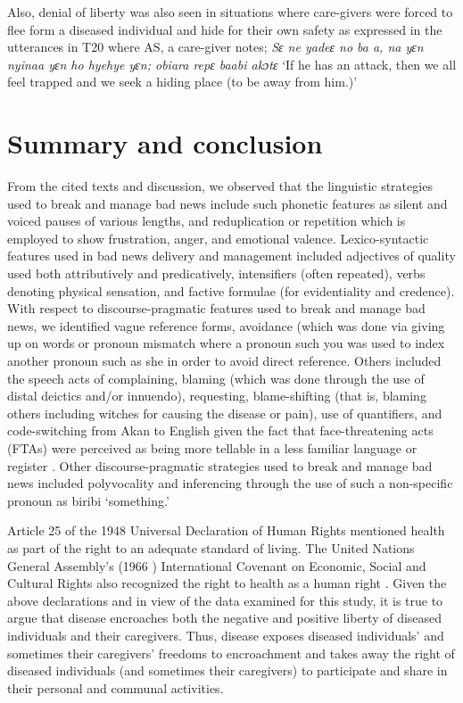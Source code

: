 \documentclass[output=paper,colorlinks,citecolor=brown]{langscibook}
\begin{document}
Also, denial of liberty was also seen in situations where care-givers were forced to flee form a diseased individual and hide for their own safety as expressed in the utterances in T20 where AS, a care-giver notes; \textit{Sɛ ne yadeɛ no ba a, na yɛn nyinaa yɛn ho hyehye yɛn; obiara repɛ baabi akɔtɛ }‘If he has an attack, then we all feel trapped and we seek a hiding place (to be away from him.)’

\section{Summary and conclusion}\label{sec:obeng:5}

From the cited texts and discussion, we observed that the linguistic strategies used to break and manage bad news include such phonetic features as silent and voiced pauses of various lengths, and reduplication or repetition which is employed to show frustration, anger, and emotional valence. Lexico-syntactic features used in bad news delivery and management included adjectives of quality used both attributively and predicatively, intensifiers (often repeated), verbs denoting physical sensation, and factive formulae (for evidentiality and credence). With respect to discourse-pragmatic features used to break and manage bad news, we identified vague reference forms, avoidance (which was done via giving up on words or pronoun mismatch where a pronoun such you was used to index another pronoun such as she in order to avoid direct reference. Others included the speech acts of complaining, blaming (which was done through the use of distal deictics and/or innuendo), requesting, blame-shifting (that is, blaming others including witches for causing the disease or pain), use of quantifiers, and code-switching from Akan to English given the fact that face-threatening acts (FTAs) were perceived as being more tellable in a less familiar language or register \citep{Movahedi1996, Obeng2008}. Other discourse-pragmatic strategies used to break and manage bad news included polyvocality and inferencing through the use of such a non-specific pronoun as biribi ‘something.’

Article 25 of the 1948 Universal Declaration of Human Rights mentioned health as part of the right to an adequate standard of living. The United Nations General Assembly’s (1966 ) International Covenant on Economic, Social and Cultural Rights also recognized the right to health as a human right \citep{United-Nations-General-Assembly1948}. Given the above declarations and in view of the data examined for this study, it is true to argue that disease encroaches both the negative and positive liberty of diseased individuals and their caregivers. Thus, disease exposes diseased individuals’ and sometimes their caregivers’ freedoms to encroachment and takes away the right of diseased individuals (and sometimes their caregivers) to participate and share in their personal and communal activities. 
\end{document}
